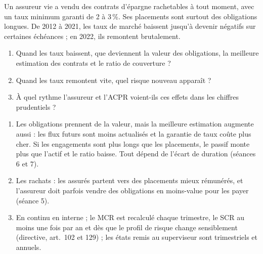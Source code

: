 \documentclass[11pt,a4paper]{article}
\begin{document}
\begin{exercice}
Un assureur vie a vendu des contrats d'épargne rachetables à tout moment, avec un taux minimum
garanti de 2 à 3\,\%. Ses placements sont surtout des obligations longues. De 2012 à 2021, les taux
de marché baissent jusqu'à devenir négatifs sur certaines échéances ; en 2022, ils remontent
brutalement.
\begin{enumerate}[nosep]
  \item Quand les taux baissent, que deviennent la valeur des obligations, la meilleure estimation
        des contrats et le ratio de couverture ?
  \item Quand les taux remontent vite, quel risque nouveau apparaît ?
  \item À quel rythme l'assureur et l'ACPR voient-ils ces effets dans les chiffres prudentiels ?
\end{enumerate}
\end{exercice}
\begin{corrige}
\begin{enumerate}[nosep]
  \item Les obligations prennent de la valeur, mais la meilleure estimation augmente aussi :
        les flux futurs sont moins actualisés et la garantie de taux coûte plus cher. Si les
        engagements sont plus longs que les placements, le passif monte plus que l'actif et le
        ratio baisse. Tout dépend de l'écart de duration (séances 6 et 7).
  \item Les rachats : les assurés partent vers des placements mieux rémunérés, et l'assureur
        doit parfois vendre des obligations en moins-value pour les payer (séance 5).
  \item En continu en interne ; le MCR est recalculé chaque trimestre, le SCR au moins une fois
        par an et dès que le profil de risque change sensiblement (directive, art.~102 et 129) ;
        les états remis au superviseur sont trimestriels et annuels.
\end{enumerate}
\end{corrige}
\end{document}
